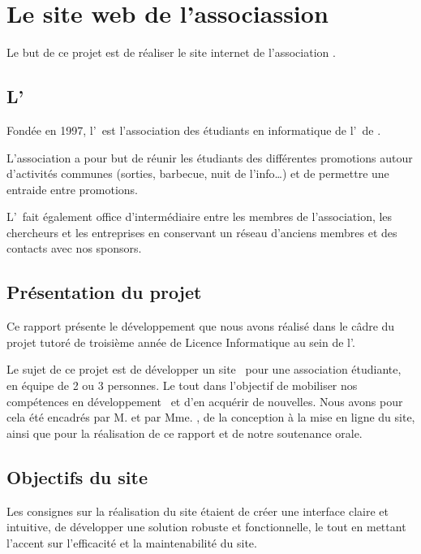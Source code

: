 \chapter{Le site web de l'associassion \ofni}
\label{chap:site}

Le but de ce projet est de réaliser le site internet de l'association \ofni.

\section{L'\ofni}
\label{sec:ofni}

Fondée en 1997, l'\ofni\ est l'association des étudiants en informatique de l'\univ\ de .
\bigskip

L'association a pour but de réunir les étudiants des différentes promotions autour d'activités communes (sorties, barbecue, nuit de l'info\ldots) et de permettre une entraide entre promotions.
\bigskip

L'\ofni\ fait également office d’intermédiaire entre les membres de l’association, les chercheurs et les entreprises en conservant un réseau d’anciens membres et des contacts avec nos sponsors.

\section{Présentation du projet}
\label{sec:presentation-projet}

Ce rapport présente le développement que nous avons réalisé dans le câdre du projet tutoré de troisième année de Licence Informatique au sein de l'\univ.
\bigskip

Le sujet de ce projet est de développer un site \web\ pour une association étudiante, en équipe de 2 ou 3 personnes.
Le tout dans l'objectif de mobiliser nos compétences en développement \web\ et d’en acquérir de nouvelles.
Nous avons pour cela été encadrés par M.  et par Mme. , de la conception à la mise en ligne du site, ainsi que pour la réalisation de ce rapport et de notre soutenance orale.

\section{Objectifs du site}
\label{sec:objectifs-site}

Les consignes sur la réalisation du site étaient de créer une interface claire et intuitive, de développer une solution robuste et fonctionnelle, le tout en mettant l’accent sur l’efficacité et la maintenabilité du site.
\bigskip

